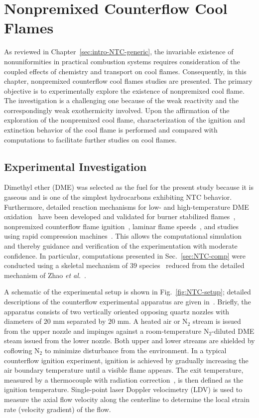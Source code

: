 \chapter{Nonpremixed Counterflow Cool Flames}\label{ch:NTC}

As reviewed in Chapter~\ref{sec:intro-NTC-generic}, the invariable existence of nonuniformities in practical combustion systems requires consideration of the coupled effects of chemistry and transport on cool flames.  Consequently, in this chapter, nonpremixed counterflow cool flames studies are presented.  The primary objective is to experimentally explore the existence of nonpremixed cool flame.  The investigation is a challenging one because of the weak reactivity and the correspondingly weak exothermicity involved.  Upon the affirmation of the exploration of the nonpremixed cool flame, characterization of the ignition and extinction behavior of the cool flame is performed and compared with computations to facilitate further studies on cool flames.

\section{Experimental Investigation}\label{sec:NTC-exp}

Dimethyl ether (DME) was selected as the fuel for the present study because it is gaseous and is one of the simplest hydrocarbons exhibiting NTC behavior.  Furthermore, detailed reaction mechanisms for low- and high-temperature DME oxidation~\cite{curran98,fischer00,curran00,zhao08} have been developed and validated for burner stabilized flames~\cite{kaiser00}, nonpremixed counterflow flame ignition~\cite{zheng05}, laminar flame speeds~\cite{qin05}, and studies using rapid compression machines~\cite{mittal08}.  This allows the computational simulation and thereby guidance and verification of the experimentation with moderate confidence. In particular, computations presented in Sec.~\ref{sec:NTC-comp} were conducted using a skeletal mechanism of $39$ species~\cite{bhagatwala15} reduced from the detailed mechanism of Zhao \emph{et al.}~\cite{zhao08}.

A schematic of the experimental setup is shown in Fig.~\ref{fig:NTC-setup}; detailed descriptions of the counterflow experimental apparatus are given in~\cite{fotache95,liu10a}.  Briefly, the apparatus consists of two vertically oriented opposing quartz nozzles with diameters of $20$ mm separated by $20$ mm.  A heated air or N$_2$ stream is issued from the upper nozzle and impinges against a room-temperature N$_2$-diluted DME steam issued from the lower nozzle.  Both upper and lower streams are shielded by coflowing N$_2$ to minimize disturbance from the environment.  In a typical counterflow ignition experiment, ignition is achieved by gradually increasing the air boundary temperature until a visible flame appears. The exit temperature, measured by a thermocouple with radiation correction~\cite{zheng06}, is then defined as the ignition temperature. Single-point laser Doppler velocimetry (LDV) is used to measure the axial flow velocity along the centerline to determine the local strain rate (velocity gradient) of the flow.

